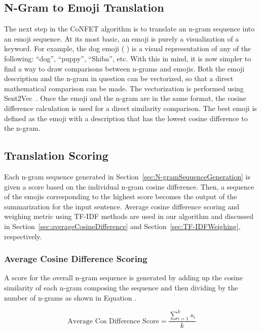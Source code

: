 \documentclass{article}[10]
\newcommand*{\img}[1]{%
  \raisebox{-.3\baselineskip}{%
    \texttt{[image: \#1]}%
  }%
}
\begin{document}
\subsection{N-Gram to Emoji Translation\label{sec:n-gramToEmojiTranslation}}

The next step in the CoNFET algorithm is to translate an n-gram sequence into an emoji sequence. At its most basic, an emoji is purely a visualization of a keyword. For example, the dog emoji (\img{emojis/1f415.png}) is a visual representation of any of the following: ``dog'', ``puppy'', ``Shiba'', etc. With this in mind, it is now simpler to find a way to draw comparisons between n-grams and emojis. Both the emoji description and the n-gram in question can be vectorized, so that a direct mathematical comparison can be made. The vectorization is performed using Sent2Vec~\cite{pg2017unsu}. Once the emoji and the n-gram are in the same format, the cosine difference calculation is used for a direct similarity comparison. The best emoji is defined as the emoji with a description that has the lowest cosine difference to the n-gram.

\subsection{Translation Scoring\label{sec:translationScoring}}

Each n-gram sequence generated in Section~\ref{sec:N-gramSequenceGeneration} is given a score based on the individual n-gram cosine difference. Then, a sequence of the emojis corresponding to the highest score becomes the output of the summarization for the input sentence. Average cosine difference scoring and weighing metric using TF-IDF methods are used in our algorithm and discussed in Section~\ref{sec:averageCosineDifference} and Section~\ref{sec:TF-IDFWeighing}, respectively.

\subsubsection{Average Cosine Difference Scoring\label{sec:averageCosineDifference}}

A score for the overall n-gram sequence is generated by adding up the cosine similarity of each n-gram composing the sequence and then dividing by the number of n-grams as shown in Equation .

\begin{equation}
   \textrm{Average Cos Difference Score} = \frac{\sum_{i=1}^{k}s_{i}}{k} \label{eq:averageCosineDifference}
\end{equation}
\end{document}

